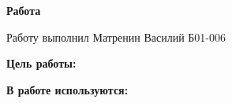 

\shiftedText{0.5cm}{14cm}
{

    \begin{center}
    \vspace*{1.0cm}

        {\bf\huge Работа \labnum }

    \vspace*{0.2cm}

        {\bf\Large \labname }

    \vspace*{0.8cm}

        {\Large Работу выполнил Матренин Василий Б01-006 }

    \vspace*{1.6cm}

    \end{center}

    {\bf\noindent Цель работы: } \labobj

    \vspace*{0.6cm}

    {\bf\noindent В работе используются: } \labequ

}

\newpage